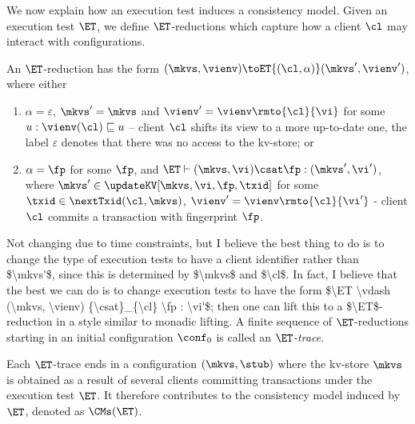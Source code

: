 We now explain how an execution test induces a consistency model. Given an execution test $\ET$, 
we define $\ET$-reductions which capture how a client $\cl$ may
interact with configurations. 
\begin{definition}[ET-reduction]
An $\ET$-reduction has the form  $(\mkvs, \vienv) \toET{(\cl, \alpha)} (\mkvs', \vienv')$, 
where either 
\begin{enumerate}
    \item $\alpha = \varepsilon$, $\mkvs' = \mkvs$ and $\vienv' = \vienv\rmto{\cl}{\vi}$ for some $u: \vienv(\cl) \sqsubseteq u$ --
	client $\cl$ shifts its view to a more up-to-date one, the label $\varepsilon$ denotes that 
	there was no access to the kv-store; or
\item $\alpha = \fp$ for some $\fp$, and $\ET \vdash (\mkvs, \vi ) \csat \fp : (\mkvs', \vi')$, where $\mkvs' \in \updateKV[\mkvs, \vi, \fp, \txid]$ 
   for some $\txid \in \nextTxid(\cl, \mkvs)$, $\vienv' =
   \vienv\rmto{\cl}{\vi'}$ -  client $\cl$ 
	commits a transaction with fingerprint $\fp$.
\end{enumerate}
\ac{Not changing due to time constraints, but I believe the best thing to do is to change the type of execution tests to have a client identifier 
rather than $\mkvs'$, since this is determined by $\mkvs$ and $\cl$. In fact, I believe that the best we can do is to change execution tests to 
have the form $\ET \vdash (\mkvs, \vienv) {\csat}_{\cl} \fp : \vi'$; then one can lift this to a $\ET$-reduction in a style similar to monadic lifting.}
A finite sequence of $\ET$-reductions starting in an
initial configuration $\conf_{0}$ is called  an \emph{$\ET$-trace}. 
\end{definition}
Each $\ET$-trace  ends in a configuration $(\mkvs, \stub)$ where the 
kv-store $\mkvs$ is obtained as a result of several clients committing transactions under the 
execution test $\ET$. It therefore contributes to the consistency model induced by $\ET$, 
denoted as $\CMs(\ET)$.
%
